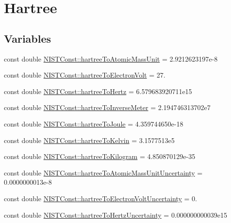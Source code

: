 \hypertarget{group___n_i_s_t_const-_hartree}{}\section{Hartree}
\label{group___n_i_s_t_const-_hartree}
\subsection*{Variables}
\begin{DoxyCompactItemize}
\item 
const double \hyperlink{group___n_i_s_t_const-_hartree_gafc823cd4d405fbad0af7abf03a28917d}{N\+I\+S\+T\+Const\+::hartree\+To\+Atomic\+Mass\+Unit} = 2.\+9212623197e-\/8
\item 
const double \hyperlink{group___n_i_s_t_const-_hartree_ga225406ee0c3f44db3c49563e7dd253ce}{N\+I\+S\+T\+Const\+::hartree\+To\+Electron\+Volt} = 27.
\item 
const double \hyperlink{group___n_i_s_t_const-_hartree_gaf2341e65d7aba07555272afe4a14345e}{N\+I\+S\+T\+Const\+::hartree\+To\+Hertz} = 6.\+579683920711e15
\item 
const double \hyperlink{group___n_i_s_t_const-_hartree_ga98d22d0957c639e03a8432aadd02f58f}{N\+I\+S\+T\+Const\+::hartree\+To\+Inverse\+Meter} = 2.\+194746313702e7
\item 
const double \hyperlink{group___n_i_s_t_const-_hartree_ga0c47e6885cdf30ceb56ac3c9420cb81c}{N\+I\+S\+T\+Const\+::hartree\+To\+Joule} = 4.\+359744650e-\/18
\item 
const double \hyperlink{group___n_i_s_t_const-_hartree_ga5468b69d29f43719e4642f9c5248e546}{N\+I\+S\+T\+Const\+::hartree\+To\+Kelvin} = 3.\+1577513e5
\item 
const double \hyperlink{group___n_i_s_t_const-_hartree_ga1184624f36892653b10c2bb068541f82}{N\+I\+S\+T\+Const\+::hartree\+To\+Kilogram} = 4.\+850870129e-\/35
\item 
const double \hyperlink{group___n_i_s_t_const-_hartree_ga7be8625774a1b159233ac984e904cdb2}{N\+I\+S\+T\+Const\+::hartree\+To\+Atomic\+Mass\+Unit\+Uncertainty} = 0.\+0000000013e-\/8
\item 
const double \hyperlink{group___n_i_s_t_const-_hartree_ga8335ddd7939b91f3191fdbed28767947}{N\+I\+S\+T\+Const\+::hartree\+To\+Electron\+Volt\+Uncertainty} = 0.
\item 
const double \hyperlink{group___n_i_s_t_const-_hartree_ga97442b1c5b8ece399ff3aebb15064a89}{N\+I\+S\+T\+Const\+::hartree\+To\+Hertz\+Uncertainty} = 0.\+000000000039e15

\end{DoxyCompactItemize}
